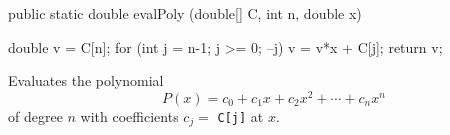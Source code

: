 \begin{code}

   public static double evalPoly (double[] C, int n, double x) \begin{hide} {
      double v = C[n];
      for (int j = n-1; j >= 0; --j)
         v = v*x + C[j];
      return v;
   }\end{hide}
\end{code}
\begin{tabb} Evaluates the polynomial 
\begin{equation}
\qquad  P(x) = c_0 + c_1 x + c_2 x^2 + \cdots + c_n x^n  \label{eq.horner}
\end{equation}
of degree $n$ with coefficients $c_j =$ \texttt{C[j]} at $x$. 
\end{tabb}
\begin{htmlonly}
\end{htmlonly}

\begin{code}\begin{hide}
}\end{hide}
\end{code}
